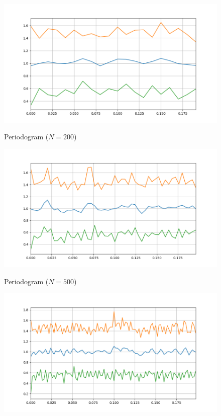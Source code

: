 \documentclass[11pt]{article}
\begin{document}
\begin{solution}

\begin{figure}
    \centering
    \begin{minipage}[t]{0.3\textwidth}
    \centerline{\includegraphics[width=\textwidth]{Assignment 1 - ML for TS (MVA 2023-2024)/bartlett_periodogram_N=200.png}}
    \centerline{Periodogram ($N=200$)}
    \end{minipage}
    \begin{minipage}[t]{0.3\textwidth}
    \centerline{\includegraphics[width=\textwidth]{Assignment 1 - ML for TS (MVA 2023-2024)/bartlett_periodogram_N=500.png}}
    \centerline{Periodogram ($N=500$)}
    \end{minipage}
    \begin{minipage}[t]{0.3\textwidth}
    \centerline{\includegraphics[width=\textwidth]{Assignment 1 - ML for TS (MVA 2023-2024)/bartlett_periodogram_N=1000.png}}

\end{minipage}
\end{figure}
\end{solution}
\end{document}
